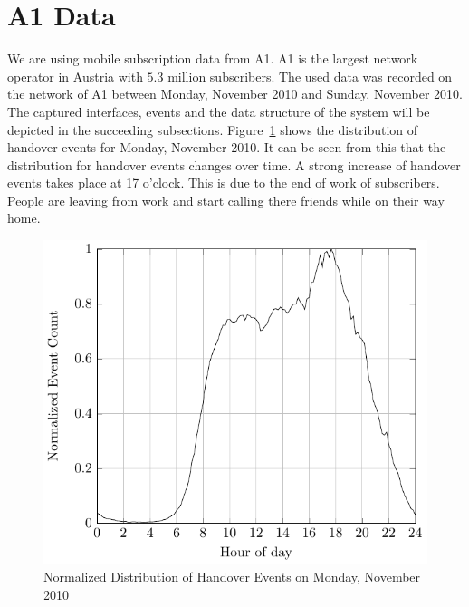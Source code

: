 \documentclass[master,english]{hgbthesis}
\begin{document}
\section{A1 Data}
We are using mobile subscription data from A1. A1 is the largest network operator in Austria with $5.3$ million subscribers. The used data was recorded on the network of A1 between Monday,  November 2010 and Sunday,  November 2010. The captured interfaces, events and the data structure of the system will be depicted in the succeeding subsections.
Figure~\ref{fig:disthandover} shows the distribution of handover events for Monday,  November 2010. It can be seen from this that the distribution for handover events changes over time. A strong increase of handover events takes place at 17 o'clock. This is due to the end of work of subscribers. People are leaving from work and start calling there friends while on their way home.
\begin{figure}
\centering
\includegraphics[width=0.7\linewidth]{./images/hauf_event_32_time_mat}
%
\caption{Normalized Distribution of Handover Events on Monday,  November 2010}
\label{fig:disthandover}
\end{figure}
%
\end{document}
